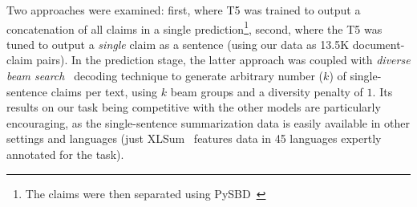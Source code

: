 \begin{enumerate}
    Two approaches were examined: first, where T5 was trained to output a concatenation of all claims in a single prediction\footnote{The claims were then separated using PySBD~\cite{sadvilkar-neumann-2020-pysbd}}, second, where the T5 was tuned to output a \textit{single} claim as a sentence (using our data as 13.5K document-claim pairs).
    In the prediction stage, the latter approach was coupled with \textit{diverse beam search}~\cite{vijaykumar_beam} decoding technique to generate arbitrary number ($k$) of single-sentence claims per text, using $k$ beam groups and a diversity penalty of $1$.
    Its results on our task being competitive with the other models are particularly encouraging, as the single-sentence summarization data is easily available in other settings and languages (just XLSum~\cite{hasan-etal-2021-xl} features data in 45 languages expertly annotated for the task). 
\end{enumerate}